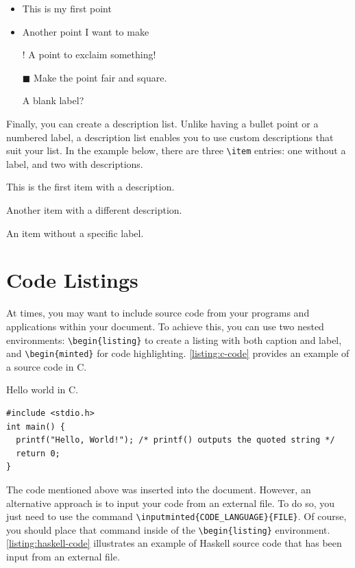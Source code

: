 {\begin{itemize}
  \item This is my first point
  \item Another point I want to make 
  \item[!] A point to exclaim something!
  \item[$\blacksquare$] Make the point fair and square.
  \item[] A blank label?
\end{itemize}

Finally, you can create a description list. Unlike having a bullet point or a numbered label, a description list enables you to use custom descriptions that suit your list. In the example below, there are three \verb|\item| entries: one without a label, and two with descriptions.

\begin{description}
    \item[Item 1:] This is the first item with a description.
    \item[Item 2:] Another item with a different description.
    \item An item without a specific label.
\end{description}

\section{Code Listings}
At times, you may want to include source code from your programs and applications within your document. To achieve this, you can use two nested environments: \verb|\begin{listing}| to create a listing with both caption and label, and \verb|\begin{minted}| for code highlighting. \autoref{listing:c-code} provides an example of a source code in C.

\begin{listing}[!htpb]
\caption{Hello world in C.}
\label{listing:c-code}
\begin{verbatim}
#include <stdio.h>
int main() {
  printf("Hello, World!"); /* printf() outputs the quoted string */
  return 0;
}
\end{verbatim}
\end{listing}

The code mentioned above was inserted into the document. However, an alternative approach is to input your code from an external file. To do so, you just need to use the command \verb|\inputminted{CODE_LANGUAGE}{FILE}|. Of course, you should place that command inside of the \verb|\begin{listing}| environment. \autoref{listing:haskell-code} illustrates an example of Haskell source code that has been input from an external file.

}
